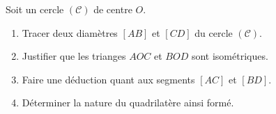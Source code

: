 \begin{exercice*}[Cercle]
    Soit un cercle $(\mathcal{C})$ de centre $O$.


        \begin{enumerate}
            \item Tracer deux diamètres $[AB]$ et $[CD]$ du cercle $(\mathcal{C})$.
            \item Justifier que les trianges $AOC$ et $BOD$ sont isométriques.
            \item Faire une déduction quant aux segments $[AC]$ et $[BD]$.
            \item Déterminer la nature du quadrilatère ainsi formé.
        \end{enumerate}
\end{exercice*}
